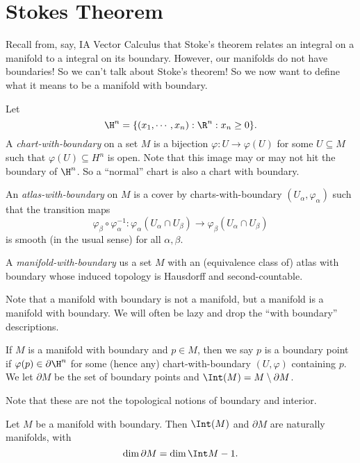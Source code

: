 \documentclass[a4paper]{article}
\begin{document}
\section{Stokes Theorem}
Recall from, say, IA Vector Calculus that Stoke's theorem relates an integral on a manifold to a integral on its boundary. However, our manifolds do not have boundaries! So we can't talk about Stoke's theorem! So we now want to define what it means to be a manifold with boundary.

\begin{defi}
  Let
  \[
    \H^n = \{(x_1, \cdots, x_n): \R^n: x_n \geq 0\}.
  \]
  A \emph{chart-with-boundary} on a set $M$ is a bijection $\varphi: U \to \varphi(U)$ for some $U \subseteq M$ such that $\varphi(U) \subseteq H^n$ is open. Note that this image may or may not hit the boundary of $\H^n$. So a ``normal'' chart is also a chart with boundary.

  An \emph{atlas-with-boundary} on $M$ is a cover by charts-with-boundary $(U_\alpha, \varphi_\alpha)$ such that the transition maps
  \[
    \varphi_\beta \circ \varphi_\alpha^{-1}: \varphi_\alpha(U_\alpha \cap U_\beta) \to \varphi_\beta(U_\alpha \cap U_\beta)
  \]
  is smooth (in the usual sense) for all $\alpha, \beta$.

  A \emph{manifold-with-boundary} us a set $M$ with an (equivalence class of) atlas with boundary whose induced topology is Hausdorff and second-countable.
\end{defi}

Note that a manifold with boundary is not a manifold, but a manifold is a manifold with boundary. We will often be lazy and drop the ``with boundary'' descriptions.

\begin{defi}
  If $M$ is a manifold with boundary and $p \in M$, then we say $p$ is a boundary point if $\varphi(p) \in \partial \H^n$ for some (hence any) chart-with-boundary $(U, \varphi)$ containing $p$. We let $\partial M$ be the set of boundary points and $\Int(M) = M \setminus \partial M$.
\end{defi}

Note that these are not the topological notions of boundary and interior.

\begin{prop}
  Let $M$ be a manifold with boundary. Then $\Int(M)$ and $\partial M$ are naturally manifolds, with
  \[
    \dim \partial M = \dim \Int M - 1.
  \]
\end{prop}
\end{document}
